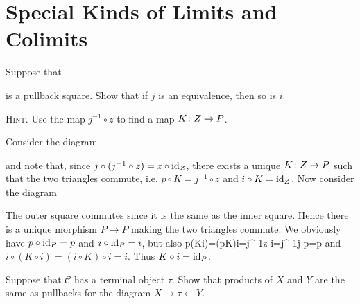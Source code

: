 \bs
\ben[label=(\alph*)]
\item 
\item 
\een
\es

\section{Special Kinds of Limits and Colimits}

\bp
Suppose that
\bse
{}
\ese
is a pullback square. Show that if $j$ is an equivalence, then so is $i$.

{\scshape Hint}. Use the map $j^{-1}\circ z$ to find a map $K\colon Z\to P$.
\ep

\bs
Consider the diagram
\bse
{}
\ese
and note that, since $j\circ(j^{-1}\circ z)=z\circ \mathrm{id}_Z$, there exists a unique $K\colon Z\to P$ such that the two triangles commute, i.e. $p\circ K=j^{-1}\circ z$ and $i\circ K=\mathrm{id}_Z$. Now consider the diagram
\bse
{}
\ese
The outer square commutes since it is the same as the inner square. Hence there is a unique morphism $P\to P$ making the two triangles commute. We obviously have $p\circ \mathrm{id}_P=p$ and $i\circ \mathrm{id}_P=i$, but also
\bse
p\circ(K\circ i)=(p\circ K)\circ i=j^{-1}\circ z \circ i=j^{-1}\circ j \circ p=p
\ese
and $i\circ(K\circ i)=(i\circ K)\circ i=i$. Thus $K\circ i=\mathrm{id}_P$.
\es

\bx
Suppose that $\mathcal{C}$ has a terminal object $\tau$. Show that products of $X$ and $Y$ are the same as pullbacks for the diagram $X\to \tau \leftarrow Y$.
\ex

